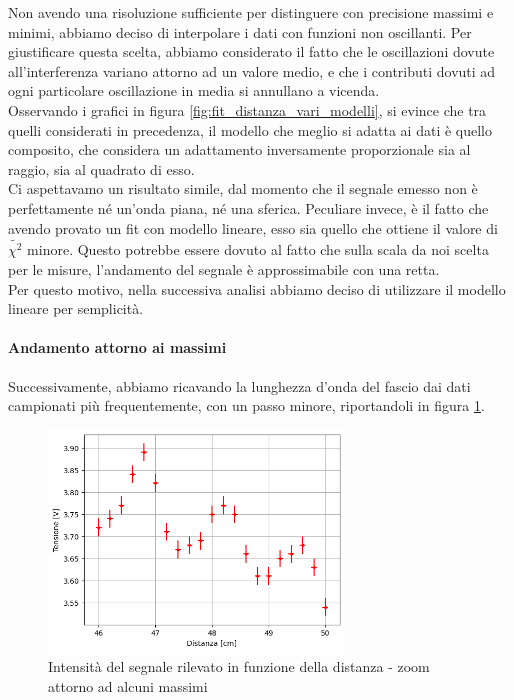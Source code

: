 \documentclass[letterpaper,12pt]{article}
\begin{document}
Non avendo una risoluzione sufficiente per distinguere con precisione massimi e minimi, abbiamo deciso di interpolare
i dati con funzioni non oscillanti. Per giustificare questa scelta, abbiamo considerato il fatto che le oscillazioni dovute all'interferenza
variano attorno ad un valore medio, e che i contributi dovuti ad ogni particolare oscillazione in media si annullano a vicenda.\\
Osservando i grafici in figura \ref{fig:fit_distanza_vari_modelli}, si evince che tra quelli considerati in precedenza, il modello che meglio si adatta
ai dati è quello composito, che considera un adattamento inversamente proporzionale sia al raggio, sia al quadrato di esso.\\
Ci aspettavamo un risultato simile, dal momento che il segnale emesso non è perfettamente né un'onda piana, né una sferica. Peculiare invece,
è il fatto che avendo provato un fit con modello lineare, esso sia quello che ottiene il valore di $\tilde{\chi^2}$ minore. Questo potrebbe essere dovuto al fatto
che sulla scala da noi scelta per le misure, l'andamento del segnale è approssimabile con una retta.\\
Per questo motivo, nella successiva analisi abbiamo deciso di utilizzare il modello lineare per semplicità.\\


\paragraph*{Andamento attorno ai massimi}
Successivamente, abbiamo ricavando la lunghezza d'onda del fascio dai dati campionati più frequentemente, con un passo minore, riportandoli in figura \ref{fig:distanza_zoom}.

\begin{figure}[h!]
	\centering
	\includegraphics[width = 0.7\textwidth]{dati_distanza_ondulatori.png}
	\caption{Intensità del segnale rilevato in funzione della distanza - zoom attorno ad alcuni massimi}
	\label{fig:distanza_zoom}
\end{figure}
\end{document}
